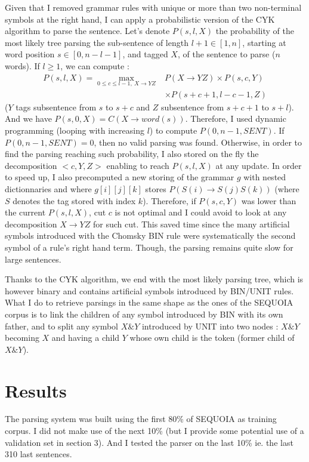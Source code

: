 \documentclass[8pt,twocolumn,letterpaper]{article}
\begin{document}
Given that I removed grammar rules with unique or more than two non-terminal symbols at the right hand, I can apply a probabilistic version of the CYK algorithm to parse the sentence. Let's denote $P(s,l,X)$ the probability of the most likely tree parsing the sub-sentence of length $l+1 \in [1,n]$, starting at word position $s \in [0,n-l-1]$, and tagged $X$, of the sentence to parse ($n$ words). If $l\geq 1$, we can compute : \begin{align*}P(s,l,X) = \max_{0 \leq c \leq l-1, ~ X \rightarrow YZ} & P(X \rightarrow YZ) \times P(s,c,Y) \\ & \times P(s+c+1,l-c-1,Z)\end{align*} ($Y$ tags subsentence from $s$ to $s+c$ and $Z$ subsentence from $s+c+1$ to $s+l$). And we have $P(s,0,X)= C(X \rightarrow word(s))$. Therefore, I used dynamic programming (looping with increasing $l$) to compute $P(0,n-1,SENT)$. If $P(0,n-1,SENT)=0$, then no valid parsing was found. Otherwise, in order to find the parsing reaching such probability, I also stored on the fly the decomposition $<c,Y,Z>$ enabling to reach $P(s,l,X)$ at any update. In order to speed up, I also precomputed a new storing of the grammar $g$ with nested dictionnaries and where $g[i][j][k]$ stores $P(S(i)\rightarrow S(j)S(k))$ (where $S$ denotes the tag stored with index $k$). Therefore, if $P(s,c,Y)$ was lower than the current $P(s,l,X)$, cut $c$ is not optimal and I could avoid to look at any decomposition $X \rightarrow YZ$ for such cut. This saved time since the many artificial symbols introduced with the Chomsky BIN rule were systematically the second symbol of a rule's right hand term. Though, the parsing remains quite slow for large sentences. 

Thanks to the CYK algorithm, we end with the most likely parsing tree, which is however binary and contains artificial symbols introduced by BIN/UNIT rules. What I do to retrieve parsings in the same shape as the ones of the SEQUOIA corpus is to link the children of any symbol introduced by BIN with its own father, and to split any symbol $X\&Y$ introduced by UNIT into two nodes : $X\&Y$ becoming $X$ and having a child $Y$ whose own child is the token (former child of $X\&Y$).

\section{Results}

The parsing system was built using the first 80\% of SEQUOIA as training corpus. I did not make use of the next 10\% (but I provide some potential use of a validation set in section 3). And I tested the parser on the last 10\% ie. the last 310 last sentences.
\end{document}
